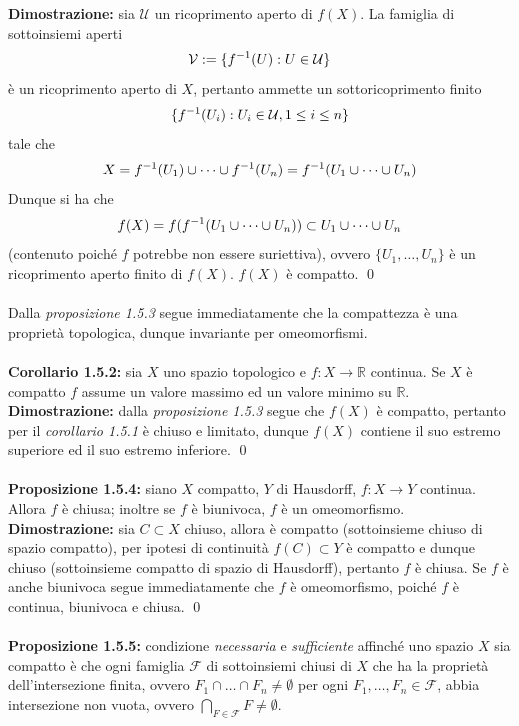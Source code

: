 \documentclass{article}
\begin{document}
\textbf{Dimostrazione:} sia $\mathcal{U}$ un ricoprimento aperto di $f(X)$. La famiglia di sottoinsiemi aperti
\begin{gather}
    \mathcal{V} := \{ f^{-1}(U) : U \in \mathcal{U} \} \notag
\end{gather}
è un ricoprimento aperto di $X$, pertanto ammette un sottoricoprimento finito
\begin{gather}
    \{ f^{-1}(U_i) : U_i \in \mathcal{U}, 1 \leq i \leq n \} \notag
\end{gather}
tale che
\begin{gather}
    X = f^{-1}(U_1) \cup \dots \cup f^{-1}(U_n) = f^{-1}(U_1 \cup \dots \cup U_n) \notag
\end{gather}
Dunque si ha che
\begin{gather}
    f(X) = f(f^{-1}(U_1 \cup \dots \cup U_n)) \subset U_1 \cup \dots \cup U_n \notag
\end{gather}
(contenuto poiché $f$ potrebbe non essere suriettiva), ovvero $\{ U_1, \dots, U_n\}$ è un ricoprimento aperto finito di $f(X)$. $f(X)$ è compatto. \qed \\ \\
Dalla \textit{proposizione 1.5.3} segue immediatamente che la compattezza è una proprietà topologica, dunque invariante per omeomorfismi. \\ \\
\textbf{Corollario 1.5.2:} sia $X$ uno spazio topologico e $f : X \longrightarrow \mathbb{R}$ continua. Se $X$ è compatto $f$ assume un valore massimo ed un valore minimo su $\mathbb{R}$. \\

\textbf{Dimostrazione:} dalla \textit{proposizione 1.5.3} segue che $f(X)$ è compatto, pertanto per il \textit{corollario 1.5.1} è chiuso e limitato, dunque $f(X)$ contiene il suo estremo superiore ed il suo estremo inferiore. \qed \\ \\
\textbf{Proposizione 1.5.4:} siano $X$ compatto, $Y$ di Hausdorff, $f : X \longrightarrow Y$ continua. Allora $f$ è chiusa; inoltre se $f$ è biunivoca, $f$ è un omeomorfismo. \\

\textbf{Dimostrazione:} sia $C \subset X$ chiuso, allora è compatto (sottoinsieme chiuso di spazio compatto), per ipotesi di continuità $f(C) \subset Y$ è compatto e dunque chiuso (sottoinsieme compatto di spazio di Hausdorff), pertanto $f$ è chiusa. Se $f$ è anche biunivoca segue immediatamente che $f$ è omeomorfismo, poiché $f$ è continua, biunivoca e chiusa. \qed \\ \\
\textbf{Proposizione 1.5.5:} condizione \textit{necessaria} e \textit{sufficiente} affinché uno spazio $X$ sia compatto è che ogni famiglia $\mathcal{F}$ di sottoinsiemi chiusi di $X$ che ha la proprietà dell'intersezione finita, ovvero $F_1 \cap \dots \cap F_n \neq \emptyset$ per ogni $F_1, \dots, F_n \in \mathcal{F}$, abbia intersezione non vuota, ovvero $\bigcap_{F \in \mathcal{F}} F \neq \emptyset$. \\
\end{document}
